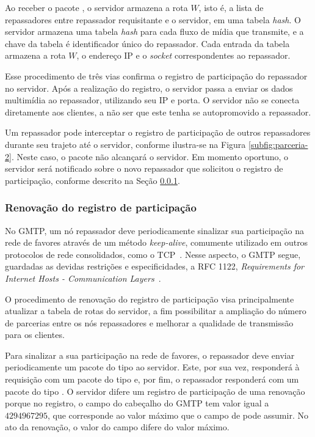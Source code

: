Ao receber o pacote , o servidor armazena a rota $W$, isto é, a lista de repassadores entre repassador requisitante e o servidor, em uma tabela \textit{hash}. 
O servidor armazena uma tabela \textit{hash} para cada fluxo de mídia que transmite, e a chave da tabela é identificador único do repassador.
Cada entrada da tabela armazena a rota $W$, o endereço IP e o \textit{socket} correspondentes ao repassador.

Esse procedimento de três vias confirma o registro de participação do repassador no servidor. Após a realização do registro, o servidor passa a enviar os dados multimídia ao repassador, utilizando seu IP e porta. O servidor não se conecta diretamente aos clientes, a não ser que este tenha se autopromovido a repassador.

Um repassador pode interceptar o registro de participação de outros repassadores durante seu trajeto até o servidor, conforme ilustra-se na Figura \ref{subfig:parceria-2}. 
Neste caso, o pacote  não alcançará o servidor. Em momento oportuno, o servidor será notificado sobre o novo repassador que solicitou o registro de participação, conforme descrito na Seção \ref{sec:renovacao}.

\subsubsection{Renovação do registro de participação}
\label{sec:renovacao}

No GMTP, um nó repassador deve periodicamente sinalizar sua participação na rede de favores através de um método \textit{keep-alive}, comumente utilizado em outros protocolos de rede consolidados, como o TCP~\cite{sales2014gmtp}. Nesse aspecto, o GMTP segue, guardadas as devidas restrições e especificidades, a RFC 1122, \textit{Requirements for Internet Hosts - Communication Layers}~\cite{RFC1122}.

O procedimento de renovação do registro de participação visa principalmente atualizar a tabela de rotas do servidor, a fim possibilitar a ampliação do número de parcerias entre os nós repassadores e melhorar a qualidade de transmissão para os clientes. 

Para sinalizar a sua participação na rede de favores, o repassador deve enviar periodicamente um pacote do tipo  ao servidor. Este, por sua vez, responderá à requisição com um pacote do tipo  e, por fim, o repassador responderá com um pacote do tipo . 
O servidor difere um registro de participação de uma renovação porque no registro, o campo  do cabeçalho do GMTP tem valor igual a $4294967295$, que corresponde ao valor máximo que o campo de  pode assumir. No ato da renovação, o valor do campo difere do valor máximo.

